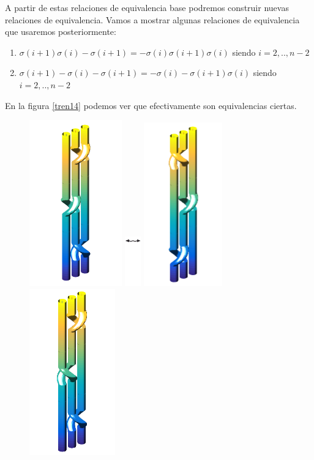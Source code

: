 \documentclass[14pt]{extarticle}
\begin{document}
	A partir de estas relaciones de equivalencia base podremos construir nuevas relaciones de equivalencia. Vamos a mostrar algunas relaciones de equivalencia que usaremos posteriormente:
	\begin{enumerate}
		\item $ \sigma(i+1)\sigma(i)-\sigma(i+1) =-\sigma(i)\sigma(i+1)\sigma(i) $ siendo $i=2,..,n-2 $		
		\item $ \sigma(i+1)-\sigma(i)-\sigma(i+1) =-\sigma(i)-\sigma(i+1)\sigma(i) $ siendo $i=2,..,n-2 $
	\end{enumerate}
	En la figura \ref{tren14} podemos ver que efectivamente son equivalencias ciertas.\\
	\begin{figure}[h!]
		\centering
		\includegraphics[width=4cm]{itrenzas/6c1.png}
		\includegraphics[width=0.7cm]{itrenzas/flechac.png}
		\includegraphics[width=3.4cm]{itrenzas/6c2.png}
		\space	
		\includegraphics[width=3.7cm]{itrenzas/6c3.png}

\end{figure}
\end{document}
